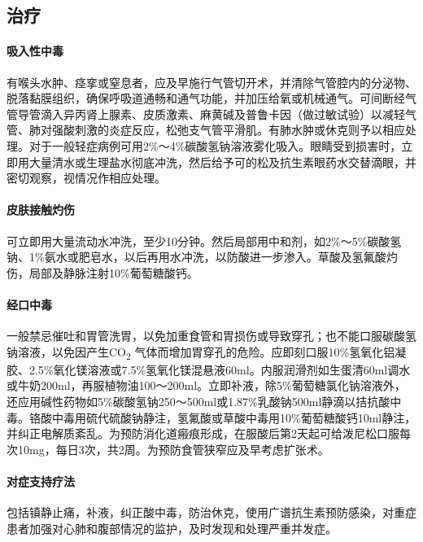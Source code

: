 \subsection{治疗}

\paragraph{吸入性中毒}

有喉头水肿、痉挛或窒息者，应及早施行气管切开术，并清除气管腔内的分泌物、脱落黏膜组织，确保呼吸道通畅和通气功能，并加压给氧或机械通气。可间断经气管导管滴入异丙肾上腺素、皮质激素、麻黄碱及普鲁卡因（做过敏试验）以减轻气管、肺对强酸刺激的炎症反应，松弛支气管平滑肌。有肺水肿或休克则予以相应处理。对于一般轻症病例可用2\%～4\%碳酸氢钠溶液雾化吸入。眼睛受到损害时，立即用大量清水或生理盐水彻底冲洗，然后给予可的松及抗生素眼药水交替滴眼，并密切观察，视情况作相应处理。

\paragraph{皮肤接触灼伤}

可立即用大量流动水冲洗，至少10分钟。然后局部用中和剂，如2\%～5\%碳酸氢钠、1\%氨水或肥皂水，以后再用水冲洗，以防酸进一步渗入。草酸及氢氟酸灼伤，局部及静脉注射10\%葡萄糖酸钙。

\paragraph{经口中毒}

一般禁忌催吐和胃管洗胃，以免加重食管和胃损伤或导致穿孔；也不能口服碳酸氢钠溶液，以免因产生CO\textsubscript{2}
气体而增加胃穿孔的危险。应即刻口服10\%氢氧化铝凝胶、2.5\%氧化镁溶液或7.5\%氢氧化镁混悬液60ml。内服润滑剂如生蛋清60ml调水或牛奶200ml，再服植物油100～200ml。立即补液，除5\%葡萄糖氯化钠溶液外，还应用碱性药物如5\%碳酸氢钠250～500ml或1.87\%乳酸钠500ml静滴以拮抗酸中毒。铬酸中毒用硫代硫酸钠静注，氢氟酸或草酸中毒用10\%葡萄糖酸钙10ml静注，并纠正电解质紊乱。为预防消化道瘢痕形成，在服酸后第2天起可给泼尼松口服每次10mg，每日3次，共2周。为预防食管狭窄应及早考虑扩张术。

\paragraph{对症支持疗法}

包括镇静止痛，补液，纠正酸中毒，防治休克，使用广谱抗生素预防感染，对重症患者加强对心肺和腹部情况的监护，及时发现和处理严重并发症。

